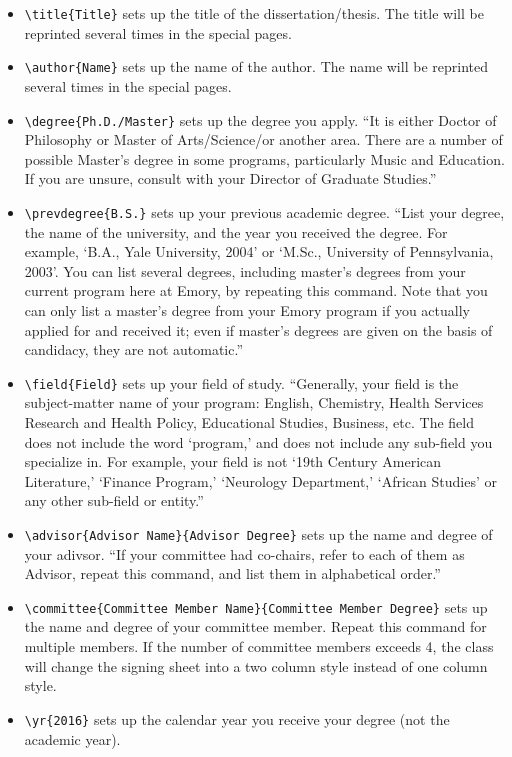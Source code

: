 \documentclass[draft]{emory}
\begin{document}
\begin{itemize}
\item \Verb|\title{Title}| sets up the title of the dissertation/thesis. The title 
will be reprinted several times in the special pages.
\item \Verb|\author{Name}| sets up the name of the author. The name will be reprinted
several times in the special pages. 
\item \Verb|\degree{Ph.D./Master}| sets up the degree you apply. ``It is either Doctor
of Philosophy or Master of Arts/Science/or another area.  There are a number of 
possible Master's degree in some programs, particularly Music and Education.  
If you are unsure, consult with your Director of Graduate Studies.''\autocite{emory-style}
\item \Verb|\prevdegree{B.S.}| sets up your previous academic degree. ``List your 
degree, the name of the university, and the year you received the degree.  
For example, `B.A., Yale University, 2004' or `M.Sc., University of Pennsylvania, 2003'.
You can list several degrees, including master's degrees from your current 
program here at Emory, by repeating this command.
Note that you can only list a master's degree from your
Emory program if you actually applied for and received it; even if master's 
degrees are given on the basis of candidacy, they are not automatic.''\autocite{emory-style} 
\item \Verb|\field{Field}| sets up your field of study. ``Generally, 
your field is the subject-matter name of your program: English, Chemistry, 
Health Services Research and Health Policy, Educational Studies, Business, etc.  
The field does not include the word `program,' and does not include any sub-field
you specialize in.  For example, your field is not `19th Century American Literature,'
`Finance Program,' `Neurology Department,' `African Studies' or any other
sub-field or entity.''\autocite{emory-style}
\item \Verb|\advisor{Advisor Name}{Advisor Degree}| sets up the name and degree of your 
adivsor. ``If your committee had co-chairs, refer to each of them as Advisor,
repeat this command, and list them in alphabetical order.''\autocite{emory-style} 
\item \Verb|\committee{Committee Member Name}{Committee Member Degree}|  sets up
the name and degree of your committee member. Repeat this command for multiple 
members. If the number of committee members exceeds 4, the class will change
the signing sheet into a two column style instead of one column style.
\item \Verb|\yr{2016}| sets up the calendar year you receive your degree
(not the academic year).
\end{itemize}
\end{document}

